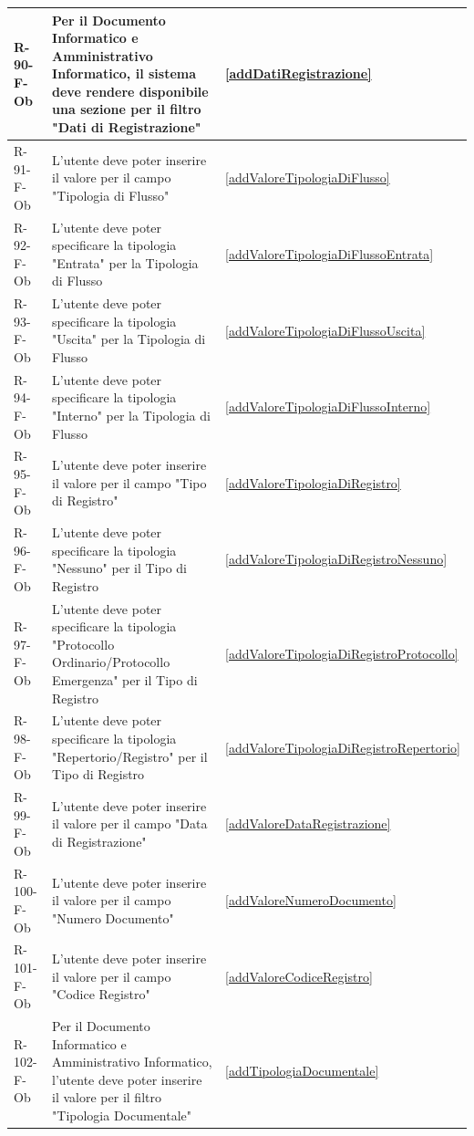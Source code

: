 \begin{longtable}{|p{2.5cm}|p{9.5cm}|p{2.5cm}|}
\hline
R-90-F-Ob & Per il Documento Informatico e Amministrativo Informatico, il sistema deve rendere disponibile una sezione per il filtro "Dati di Registrazione" & \ref{addDatiRegistrazione} \\
\hline
R-91-F-Ob & L'utente deve poter inserire il valore per il campo "Tipologia di Flusso" & \ref{addValoreTipologiaDiFlusso} \\
\hline
R-92-F-Ob & L'utente deve poter specificare la tipologia "Entrata" per la Tipologia di Flusso & \ref{addValoreTipologiaDiFlussoEntrata} \\
\hline
R-93-F-Ob & L'utente deve poter specificare la tipologia "Uscita" per la Tipologia di Flusso & \ref{addValoreTipologiaDiFlussoUscita} \\
\hline
R-94-F-Ob & L'utente deve poter specificare la tipologia "Interno" per la Tipologia di Flusso & \ref{addValoreTipologiaDiFlussoInterno} \\
\hline
R-95-F-Ob & L'utente deve poter inserire il valore per il campo "Tipo di Registro" & \ref{addValoreTipologiaDiRegistro} \\
\hline
R-96-F-Ob & L'utente deve poter specificare la tipologia "Nessuno" per il Tipo di Registro & \ref{addValoreTipologiaDiRegistroNessuno} \\
\hline
R-97-F-Ob & L'utente deve poter specificare la tipologia "Protocollo Ordinario/Protocollo Emergenza" per il Tipo di Registro & \ref{addValoreTipologiaDiRegistroProtocollo} \\
\hline
R-98-F-Ob & L'utente deve poter specificare la tipologia "Repertorio/Registro" per il Tipo di Registro & \ref{addValoreTipologiaDiRegistroRepertorio} \\
\hline
R-99-F-Ob & L'utente deve poter inserire il valore per il campo "Data di Registrazione" & \ref{addValoreDataRegistrazione} \\
\hline
R-100-F-Ob & L'utente deve poter inserire il valore per il campo "Numero Documento" & \ref{addValoreNumeroDocumento} \\
\hline
R-101-F-Ob & L'utente deve poter inserire il valore per il campo "Codice Registro" & \ref{addValoreCodiceRegistro} \\
\hline

R-102-F-Ob & Per il Documento Informatico e Amministrativo Informatico, l'utente deve poter inserire il valore per il filtro "Tipologia Documentale" & \ref{addTipologiaDocumentale} \\
\hline


\end{longtable}
